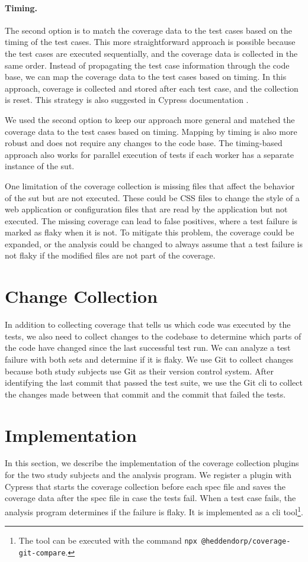 \paragraph{Timing.} The second option is to match the coverage data to the test cases based on the timing of the test cases.
This more straightforward approach is possible because the test cases are executed sequentially, and the coverage data is collected in the same order.
Instead of propagating the test case information through the code base, we can map the coverage data to the test cases based on timing.
In this approach, coverage is collected and stored after each test case, and the collection is reset.
This strategy is also suggested in Cypress documentation \autocite{noauthor_code_nodate}.

We used the second option to keep our approach more general and matched the coverage data to the test cases based on timing.
Mapping by timing is also more robust and does not require any changes to the code base.
The timing-based approach also works for parallel execution of tests if each worker has a separate instance of the \ac{sut}.

One limitation of the coverage collection is missing files that affect the behavior of the \ac{sut} but are not executed.
These could be CSS files to change the style of a web application or configuration files that are read by the application but not executed.
The missing coverage can lead to false positives, where a test failure is marked as flaky when it is not.
To mitigate this problem, the coverage could be expanded, or the analysis could be changed to always assume that a test failure is not flaky if the modified files are not part of the coverage.
\section{Change Collection}
In addition to collecting coverage that tells us which code was executed by the tests, we also need to collect changes to the codebase to determine which parts of the code have changed since the last successful test run.
We can analyze a test failure with both sets and determine if it is flaky.
We use Git to collect changes because both study subjects use Git as their version control system.
After identifying the last commit that passed the test suite, we use the Git \ac{cli} to collect the changes made between that commit and the commit that failed the tests.

\section{Implementation}
In this section, we describe the implementation of the coverage collection plugins for the two study subjects and the analysis program.
We register a plugin with Cypress that starts the coverage collection before each spec file and saves the coverage data after the spec file in case the tests fail.
When a test case fails, the analysis program determines if the failure is flaky.
It is implemented as a \ac{cli} tool\footnote{The tool can be executed with the command \texttt{npx @heddendorp/coverage-git-compare}.}.

